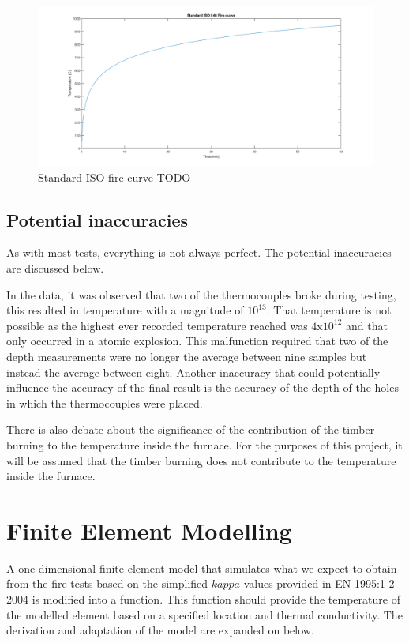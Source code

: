 	\begin{figure}[H]
	\centering 
	\includegraphics[width=\linewidth]{figures/firecurve.png}
	\caption{Standard ISO fire curve TODO}
	\label{firecurve_fig}
	\end{figure}
	
	\subsection{Potential inaccuracies}
	As with most tests, everything is not always perfect. 
	The potential inaccuracies are discussed below. 
	
	In the data, it was observed that two of the thermocouples broke during testing, this resulted in temperature with a magnitude of $10^{13}$. 
	That temperature is not possible as the highest ever recorded temperature reached was $4\text{x}10^{12}$ and that only occurred in a atomic explosion. %
	This malfunction required that two of the depth measurements were no longer the average between nine samples but instead the average between eight.
	Another inaccuracy that could potentially influence the accuracy of the final result is the accuracy of the depth of the holes in which the thermocouples were placed. 
	
	There is also debate about the significance of the contribution of the timber burning to the temperature inside the furnace. 
	For the purposes of this project, it will be assumed that the timber burning does not contribute to the temperature inside the furnace.
	
\section{Finite Element Modelling}\label{femexpl}
A one-dimensional finite element model that simulates what we expect to obtain from the fire tests based on the simplified $kappa$-values provided in EN 1995:1-2-2004 is modified into a function.
This function should provide the temperature of the modelled element based on a specified location and thermal conductivity.
The derivation and adaptation of the model are expanded on below.
